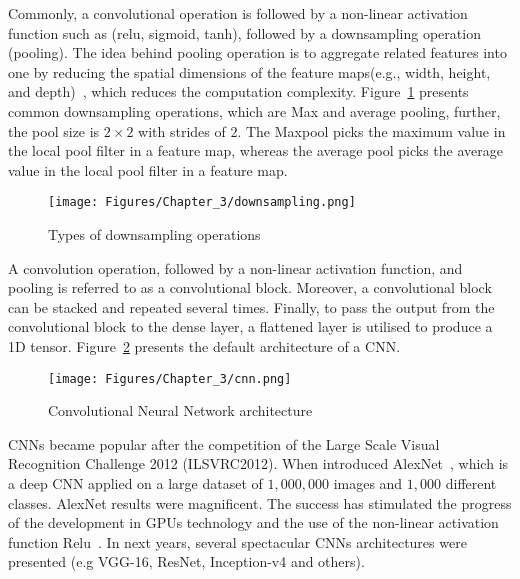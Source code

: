 Commonly, a convolutional operation is followed by a non-linear activation function such as (relu, sigmoid, tanh), followed by a downsampling operation (pooling). 
The idea behind pooling operation is to aggregate related features into one by reducing the spatial dimensions of the feature maps(e.g., width, height, and depth)~\cite{Lecun2015}, which reduces the computation complexity.
Figure~\ref{fig:downsampling} presents common downsampling operations, which are Max and average pooling, further, the pool size is \(2 \times 2\) with strides of \(2\).
The Maxpool picks the maximum value in the local pool filter in a feature map, whereas the average pool picks the average value in the local pool filter in a feature map.
\begin{figure} [!ht]
	\begin{center}
		\centering
		\texttt{[image: Figures/Chapter\_3/downsampling.png]}
	\end{center}
	\caption{Types of downsampling operations} 
	\label{fig:downsampling}
\end{figure}
A convolution operation, followed by a non-linear activation function, and pooling is referred to as a convolutional block.
Moreover, a convolutional block can be stacked and repeated several times. 
Finally, to pass the output from the convolutional block to the dense layer, a flattened layer is utilised to produce a 1D tensor.
Figure~\ref{fig:CNN} presents the default architecture of a CNN.
\begin{figure} [!ht]
	\begin{center}
		\centering
		\texttt{[image: Figures/Chapter\_3/cnn.png]}
	\end{center}
	\caption{Convolutional Neural Network architecture} 
	\label{fig:CNN}
\end{figure}

CNNs became popular after the competition of the Large Scale Visual Recognition Challenge 2012 (ILSVRC2012). 
When \textcite{Krizhevsky2012} introduced AlexNet~\cite{Krizhevsky2012}, which is a deep CNN applied on a large dataset of \(1,000,000\) images and \(1,000\) different classes.
AlexNet results were magnificent. 
The success has stimulated the progress of the development in GPUs technology and the use of the non-linear activation function Relu~\cite{Lecun2015}.
In next years, several spectacular CNNs architectures were presented (e.g VGG-16, ResNet, Inception-v4 and others).
